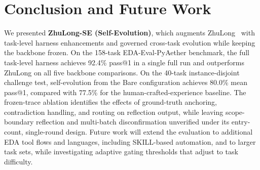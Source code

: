 \section{Conclusion and Future Work}

We presented \textbf{ZhuLong-SE (Self-Evolution)}, which augments ZhuLong~\cite{liu2026zhulong} with task-level harness enhancements and governed cross-task evolution while keeping the backbone frozen. On the 158-task EDA-Eval-PyAether benchmark, the full task-level harness achieves 92.4\% pass@1 in a single full run and outperforms ZhuLong on all five backbone comparisons. On the 40-task instance-disjoint challenge test, self-evolution from the Bare configuration achieves 80.0\% mean pass@1, compared with 77.5\% for the human-crafted-experience baseline. The frozen-trace ablation identifies the effects of ground-truth anchoring, contradiction handling, and routing on reflection output, while leaving scope-boundary reflection and multi-batch disconfirmation unverified under its entry-count, single-round design. Future work will extend the evaluation to additional EDA tool flows and languages, including SKILL-based automation, and to larger task sets, while investigating adaptive gating thresholds that adjust to task difficulty.


